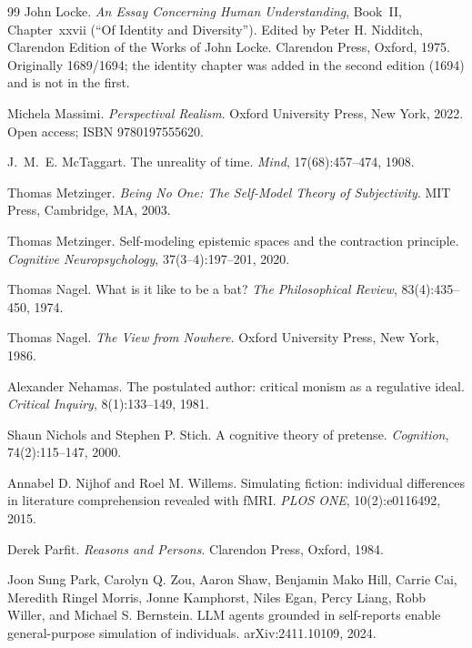 \documentclass[11pt,a4paper]{article}
\theoremstyle{remark}\newtheorem{remark}[definition]{Remark}
\begin{document}
\begin{thebibliography}{99}
John Locke.
\newblock \emph{An Essay Concerning Human Understanding}, Book~II, Chapter~xxvii (``Of Identity and Diversity'').
\newblock Edited by Peter H. Nidditch, Clarendon Edition of the Works of John Locke. Clarendon Press, Oxford, 1975. Originally 1689/1694; the identity chapter was added in the second edition (1694) and is not in the first.

Michela Massimi.
\newblock \emph{Perspectival Realism}.
\newblock Oxford University Press, New York, 2022. Open access; ISBN 9780197555620.

J.~M.~E. McTaggart.
\newblock The unreality of time.
\newblock \emph{Mind}, 17(68):457--474, 1908.

Thomas Metzinger.
\newblock \emph{Being No One: The Self-Model Theory of Subjectivity}.
\newblock MIT Press, Cambridge, MA, 2003.

Thomas Metzinger.
\newblock Self-modeling epistemic spaces and the contraction principle.
\newblock \emph{Cognitive Neuropsychology}, 37(3--4):197--201, 2020.

Thomas Nagel.
\newblock What is it like to be a bat?
\newblock \emph{The Philosophical Review}, 83(4):435--450, 1974.

Thomas Nagel.
\newblock \emph{The View from Nowhere}.
\newblock Oxford University Press, New York, 1986.

Alexander Nehamas.
\newblock The postulated author: critical monism as a regulative ideal.
\newblock \emph{Critical Inquiry}, 8(1):133--149, 1981.

Shaun Nichols and Stephen P. Stich.
\newblock A cognitive theory of pretense.
\newblock \emph{Cognition}, 74(2):115--147, 2000.

Annabel D. Nijhof and Roel M. Willems.
\newblock Simulating fiction: individual differences in literature comprehension revealed with fMRI.
\newblock \emph{PLOS ONE}, 10(2):e0116492, 2015.

Derek Parfit.
\newblock \emph{Reasons and Persons}.
\newblock Clarendon Press, Oxford, 1984.

Joon Sung Park, Carolyn Q. Zou, Aaron Shaw, Benjamin Mako Hill, Carrie Cai, Meredith Ringel Morris, Jonne Kamphorst, Niles Egan, Percy Liang, Robb Willer, and Michael S. Bernstein.
\newblock LLM agents grounded in self-reports enable general-purpose simulation of individuals.
\newblock arXiv:2411.10109, 2024.


\end{thebibliography}
\end{document}

